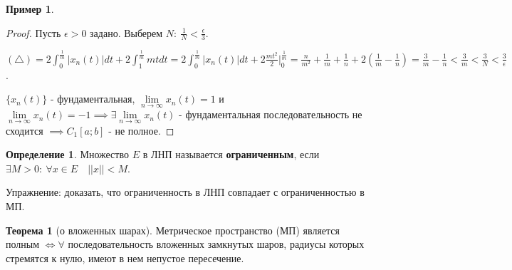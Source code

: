 \documentclass{report}
\theoremstyle{definition}
\newtheorem{definition}{Определение}[section]
\newtheorem{example}{Пример}
\newtheorem{theorem}{Теорема}[section]
\begin{document}
\begin{example}
\begin{enumerate}
\begin{proof}
            Пусть $\epsilon > 0$ задано. Выберем $N: \ \frac{1}{N} < \frac{\epsilon}{3}$.

            $(\triangle) = 2\int_{0}^{\frac{1}{m}}|x_n(t)|dt + 2\int_{1}^{\frac{1}{m}}mtdt = 2\int_{0}^{\frac{1}{m}}
              |x_n(t)|dt + 2\frac{mt^2}{2}\bigg|^{\frac{1}{m}}_0 = \frac{n}{m^2} + \frac{1}{m} + \frac{1}{n}
              + 2(\frac{1}{m} - \frac{1}{n}) = \frac{3}{m} - \frac{1}{n} < \frac{3}{m} < \frac{3}{N} < \frac{3}{\epsilon}$.

            $\{x_n(t)\}$ - фундаментальная, $\underset{n\rightarrow\infty}{\lim} x_n(t) = 1$ и
            $\underset{n\rightarrow\infty}{\lim} x_n(t) = -1 \implies \exists \underset{n\rightarrow\infty}{\lim} x_n(t)$
            - фундаментальная последовательность не сходится $\implies C_1[a;b]$ - не полное.
          \end{proof}
  \end{enumerate}
\end{example}

\begin{definition}
  Множество $E$ в ЛНП называется \textbf{ограниченным}, если $\exists M>0: \ \forall x \in E \quad ||x||<M$.
\end{definition}

Упражнение: доказать, что ограниченность в ЛНП совпадает с ограниченностью в МП.

\begin{theorem}[о вложенных шарах]
  Метрическое пространство (МП) является полным $\iff \forall$ последовательность вложенных замкнутых шаров,
  радиусы которых стремятся к нулю, имеют в нем непустое пересечение.
\end{theorem}
\end{document}
